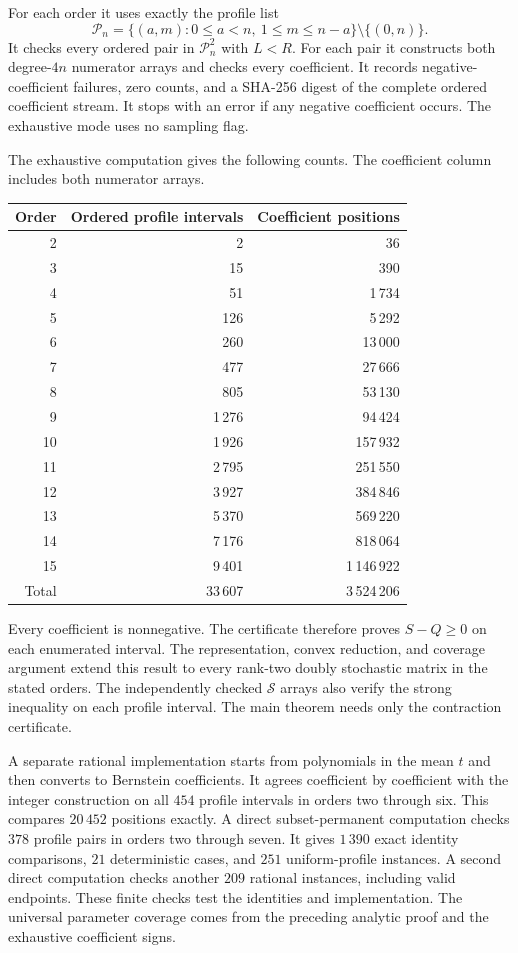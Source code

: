 \documentclass[11pt,a4paper]{article}
\theoremstyle{definition}
\theoremstyle{remark}
\begin{document}
For each order it uses exactly the profile list
\[
\mathcal P_n=\{(a,m):0\le a<n,\ 1\le m\le n-a\}\setminus\{(0,n)\}.
\]
It checks every ordered pair in $\mathcal P_n^2$ with $L<R$.
For each pair it constructs both degree-$4n$ numerator arrays and checks every coefficient.
It records negative-coefficient failures, zero counts, and a SHA-256 digest of the complete ordered coefficient stream.
It stops with an error if any negative coefficient occurs.
The exhaustive mode uses no sampling flag.

The exhaustive computation gives the following counts.
The coefficient column includes both numerator arrays.
\begin{center}\small
\begin{tabular}{rrr}
\toprule
Order & Ordered profile intervals & Coefficient positions\\
\midrule
2&2&36\\
3&15&390\\
4&51&1\,734\\
5&126&5\,292\\
6&260&13\,000\\
7&477&27\,666\\
8&805&53\,130\\
9&1\,276&94\,424\\
10&1\,926&157\,932\\
11&2\,795&251\,550\\
12&3\,927&384\,846\\
13&5\,370&569\,220\\
14&7\,176&818\,064\\
15&9\,401&1\,146\,922\\
\midrule
Total&33\,607&3\,524\,206\\
\bottomrule
\end{tabular}
\end{center}
Every coefficient is nonnegative.
The certificate therefore proves $S-Q\ge0$ on each enumerated interval.
The representation, convex reduction, and coverage argument extend this result to every rank-two doubly stochastic matrix in the stated orders.
The independently checked $\mathcal S$ arrays also verify the strong inequality on each profile interval.
The main theorem needs only the contraction certificate.

A separate rational implementation starts from polynomials in the mean $t$ and then converts to Bernstein coefficients.
It agrees coefficient by coefficient with the integer construction on all $454$ profile intervals in orders two through six.
This compares $20\,452$ positions exactly.
A direct subset-permanent computation checks $378$ profile pairs in orders two through seven.
It gives $1\,390$ exact identity comparisons, $21$ deterministic cases, and $251$ uniform-profile instances.
A second direct computation checks another $209$ rational instances, including valid endpoints.
These finite checks test the identities and implementation.
The universal parameter coverage comes from the preceding analytic proof and the exhaustive coefficient signs.
\end{document}
